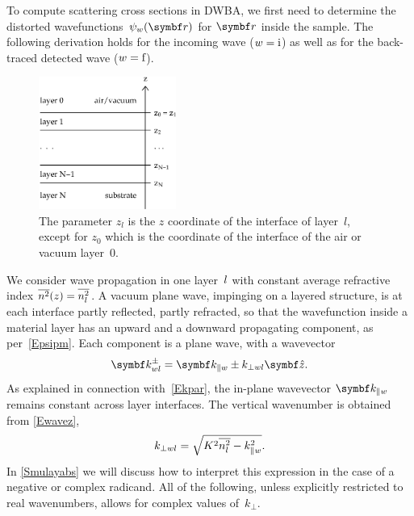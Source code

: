 To compute scattering cross sections in DWBA,
we first need to determine the distorted wavefunctions~$\psi_w(\r)$
for $\r$ inside the sample.
The following derivation holds for the incoming wave ($w=\text{i}$)
as well as for the back-traced detected wave ($w=\text{f}$).

\begin{figure}[tb]
\begin{center}
\includegraphics[width=0.4\textwidth]{fig/drawing/multilayer_z_conventions.ps}
\end{center}
\caption{The parameter $z_l$ is the $z$ coordinate of the  interface
%
%
%
%
of layer~$l$, except for $z_0$ which is the coordinate of the  interface
of the air or vacuum layer~0.}
\label{Fdefz}
\end{figure}

We consider wave propagation in one layer~$l$
%
with constant average refractive index $\overline{n^2}(z)=\overline{n_l^2}$.
A vacuum plane wave, impinging on a layered structure,
is at each interface partly reflected, partly refracted,
so that the wavefunction inside a material layer
has an upward and a downward propagating component,
as per~\cref{Epsipm}.
Each component is a plane wave,
with a wavevector
\begin{equation}\label{Ekpmwj3}
  \k^\pm_{w\il}= \k_{\plll w} \pm k_{\perp w\il}\v{\hat z}.
\end{equation}
%
%
As explained in connection with~\cref{Ekpar},
the in-plane wavevector $\k_{\plll w}$ remains constant
across layer interfaces.
The vertical wavenumber is obtained from \cref{Ewavez},
\begin{equation}\label{Ekperpwj}
  k_{\perp wl} = \sqrt{K^2 \overline{n_l^2} - k_{\parallel w}^2}.
\end{equation}
In \cref{Smulayabs} we will discuss how to interpret this expression
in the case of a negative or complex radicand.
All of the following, unless explicitly restricted to real wavenumbers,
allows for complex values of~$k_\perp$.

